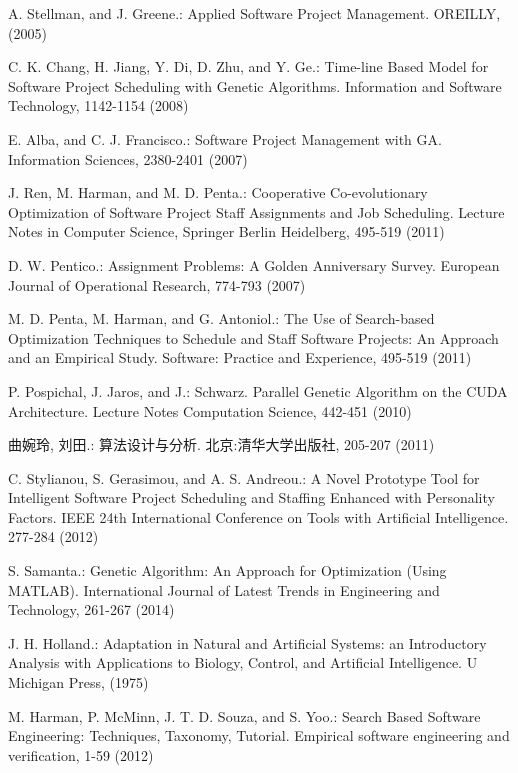 %
%
\begin{thebibliography}{}
%
A. Stellman, and J. Greene.:
Applied Software Project Management.
OREILLY, (2005)

C. K. Chang, H. Jiang, Y. Di, D. Zhu, and Y. Ge.:
Time-line Based Model for Software Project 
Scheduling with Genetic Algorithms.
Information and Software Technology, 1142-1154 (2008)

E. Alba, and C. J. Francisco.:
Software Project Management with GA.
Information Sciences, 2380-2401 (2007)

J. Ren, M. Harman, and M. D. Penta.:
Cooperative Co-evolutionary Optimization of Software 
Project Staff Assignments and Job Scheduling.
Lecture Notes in Computer Science, Springer Berlin Heidelberg, 495-519 (2011)

D. W. Pentico.:
Assignment Problems: A Golden Anniversary Survey.
European Journal of Operational Research, 774-793 (2007)

M. D. Penta, M. Harman, and G. Antoniol.:
The Use of Search-based Optimization Techniques to 
Schedule and Staff Software Projects: An Approach and an Empirical Study. 
Software: Practice and Experience, 495-519 (2011)

P. Pospichal, J. Jaros, and J.:
Schwarz. Parallel Genetic Algorithm on the CUDA Architecture.
Lecture Notes Computation Science, 442-451 (2010)

曲婉玲, 刘田.:
算法设计与分析.
北京:清华大学出版社, 205-207 (2011)

C. Stylianou, S. Gerasimou, and A. S. Andreou.:
A Novel Prototype Tool for Intelligent Software 
Project Scheduling and Staffing Enhanced with Personality Factors.
IEEE 24th International Conference on Tools with Artificial Intelligence. 277-284 (2012)

S. Samanta.:
Genetic Algorithm: An Approach for Optimization (Using MATLAB). 
International Journal of Latest Trends in Engineering and Technology, 261-267 (2014)

J. H. Holland.:
Adaptation in Natural and Artificial Systems: an Introductory 
Analysis with Applications to Biology, Control, and Artificial Intelligence.
U Michigan Press, (1975)

M. Harman, P. McMinn, J. T. D. Souza, and S. Yoo.:
Search Based Software Engineering: Techniques, Taxonomy, Tutorial.
Empirical software engineering and verification, 1-59 (2012)


\end{thebibliography}
